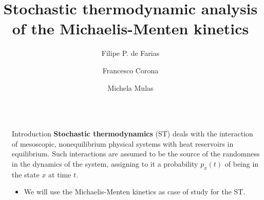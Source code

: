 \documentclass[final]{beamer}
\title{Stochastic thermodynamic analysis of the Michaelis-Menten kinetics}
\author{Filipe P. de Farias\inst{1} \and Francesco Corona\inst{1}  \and Michela Mulas\inst{1}}
\institute[shortinst]{\inst{1}Dept.}
\newlength{\sepwidth}
\newlength{\colwidth}
\newcommand{\separatorcolumn}{\begin{column}{\sepwidth}\end{column}}
\begin{document}
\setlength{\abovedisplayskip}{40pt}
\setlength{\belowdisplayskip}{40pt}

\begin{frame}[t]
\begin{columns}[t]
\separatorcolumn

\begin{column}{\colwidth}

\begin{block}{Introduction}
{\bf Stochastic thermodynamics} (ST) deals with the interaction of mesoscopic, nonequilibrium physical systems with heat reservoirs in equilibrium.\cite{peliti2021stochastic} Such interactions are assumed to be the source of the randomness in the dynamics of the system, assigning to it a probability $p_x(t)$ of being in the state $x$ at time $t$.
\begin{itemize}
\item We will use the Michaelis-Menten kinetics as case of study for the ST.
\end{itemize}
\end{block}


\end{column}
\end{columns}
\end{frame}
\end{document}
